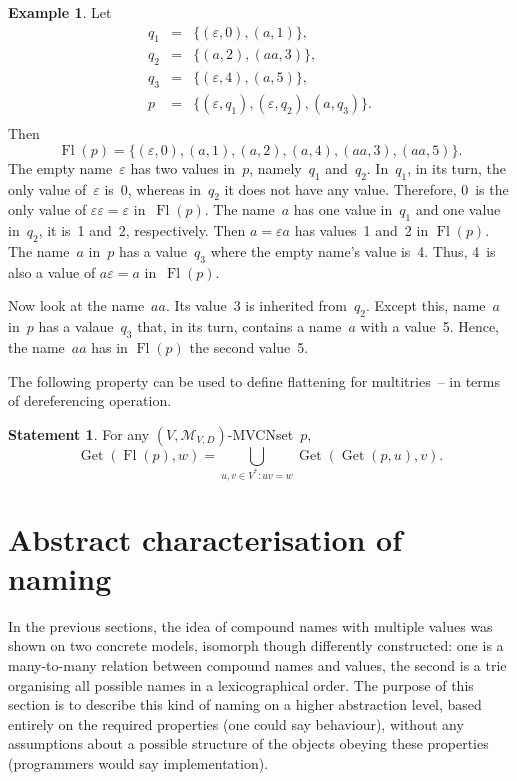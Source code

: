 \documentclass{article}
\theoremstyle{definition}
\newtheorem{St}{Statement}
\newtheorem{Ex}{Example}
\newcommand{\setcharmvcn}{M}
\newcommand{\setsymbol}[3]{\mathcal{#1}_{#2,#3}}
\newcommand{\setmvcn}[2]{\setsymbol{\setcharmvcn}{#1}{#2}}
\newcommand{\flatten}{\operatorname{Fl}}
\newcommand{\deref}{\operatorname{Get}}
\begin{document}
\begin{Ex}\label{ex:flatten}
Let
\begin{eqnarray*}
  q_1 & = & \{ (\varepsilon, 0), (a, 1) \} ,\\
  q_2 & = & \{ (a, 2), (aa, 3) \} ,\\
  q_3 & = & \{ (\varepsilon, 4), (a, 5) \} ,\\
  p   & = & \{ (\varepsilon, q_1), (\varepsilon, q_2), (a, q_3) \} .\\
\end{eqnarray*}
Then
\[
  \flatten(p) = \{
      (\varepsilon, 0), (a, 1), (a, 2), (a, 4), (aa, 3), (aa, 5)
  \} .
\]
The empty name~$\varepsilon$ has two values in~$p$, namely~$q_1$ and~$q_2$.
In~$q_1$, in its turn, the only value of~$\varepsilon$ is~0, whereas in~$q_2$
it does not have any value. Therefore, 0~is the only value of $\varepsilon
\varepsilon = \varepsilon$ in~$\flatten(p)$.  The name~$a$ has one value in~$q_1$
and one value in~$q_2$, it is~1 and~2, respectively.  Then $a = \varepsilon a$
has values~1 and~2 in $\flatten(p)$.  The name~$a$ in~$p$ has a value~$q_3$
where the empty name's value is~4. Thus, 4~is also a value of $a \varepsilon =
a$ in~$\flatten(p)$.

Now look at the name~$aa$. Its value~3 is inherited from~$q_2$. Except this,
name~$a$ in~$p$ has a valaue~$q_3$ that, in its turn, contains a name~$a$ with
a value~5. Hence, the name~$aa$ has in $\flatten(p)$ the second value~5.
\end{Ex}

The following property can be used to define flattening for multitries~--
in terms of dereferencing operation.
\begin{St}\label{st:deref-flatten}
For any $(V,\setmvcn{V}{D})$-MVCNset~$p$,
\[
  \deref(\flatten(p), w) =
      \bigcup_{u,v\in V^\ast: uv = w}
        \deref(\deref(p, u), v) .
\]
\end{St}



\section{Abstract characterisation of naming}

In the previous sections, the idea of compound names with multiple values was
shown on two concrete models, isomorph though differently constructed: one is a
many-to-many relation between compound names and values, the second is a trie
organising all possible names in a lexicographical order.  The purpose of this
section is to describe this kind of naming on a higher abstraction level,
based entirely on the required properties (one could say behaviour), without
any assumptions about a possible structure of the objects obeying these
properties (programmers would say implementation).
\end{document}

